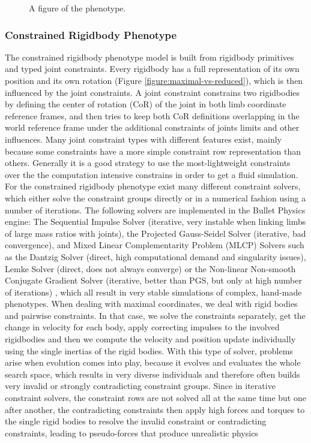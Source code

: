 \documentclass[main]{subfiles}
\begin{document}
\begin{figure}[H]
\centering


\caption[A figure of the phenotype]{A figure of the phenotype.}
\label{figure:direct-encoding}
\end{figure}

\subsubsection{Constrained Rigidbody Phenotype}

The constrained rigidbody phenotype model is built from rigidbody primitives and typed joint constraints. Every rigidbody has a full representation of its own position and its own rotation (Figure \ref{figure:maximal-vs-reduced}), which is then influenced by the joint constraints. A joint constraint constrains two rigidbodies by defining the center of rotation (CoR) of the joint in both limb coordinate reference frames, and then tries to keep both CoR definitions overlapping in the world reference frame under the additional constraints of joints limits and other influences.  Many joint constraint types with different features exist, mainly because some constraints have a more simple constraint row representation than others. Generally it is a good strategy to use the most-lightweight constraints over the the computation intensive constrains in order to get a fluid simulation. For the constrained rigidbody phenotype exist many different constraint solvers, which either solve the constraint groups directly or in a numerical fashion using a number of iterations. The following solvers are implemented in the Bullet Physics engine: The Sequential Impulse Solver (iterative, very instable when linking limbs of large mass ratios with joints), the Projected Gauss-Seidel Solver (iterative, bad convergence), and Mixed Linear Complementarity Problem (MLCP) Solvers such as the Dantzig Solver (direct, high computational demand and singularity issues), Lemke Solver (direct, does not always converge) or the Non-linear Non-smooth Conjugate Gradient Solver (iterative, better than PGS, but only at high number of iterations) \cite{bib::Coumans2014}, which all result in very stable simulations of complex, hand-made phenotypes.  When dealing with maximal coordinates, we deal with rigid bodies and pairwise constraints. In that case, we solve the constraints separately, get the change in velocity for each body, apply correcting impulses to the involved rigidbodies and then we compute the velocity and position update individually using the single inertias of the rigid bodies. With this type of solver, problems arise when evolution comes into play, because it evolves and evaluates the whole search space, which results in very diverse individuals and therefore often builds very invalid or strongly contradicting constraint groups. Since in iterative constraint solvers, the constraint rows are not solved all at the same time but one after another, the contradicting constraints then apply high forces and torques to the single rigid bodies to resolve the invalid constraint or contradicting constraints, leading to pseudo-forces that produce unrealistic physics 
\end{document}
